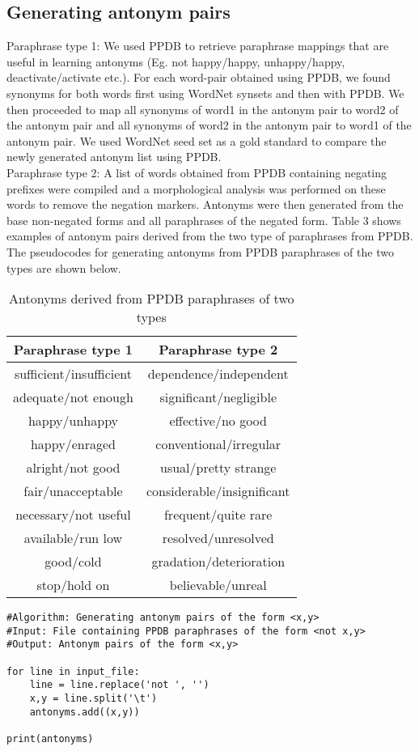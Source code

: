 \documentclass[11pt]{article}
\begin{document}
\subsection{Generating antonym pairs}
Paraphrase type 1:  We used PPDB to retrieve paraphrase mappings that are useful in learning antonyms (Eg. not happy/happy, unhappy/happy, deactivate/activate etc.). For each word-pair obtained using PPDB, we found synonyms for both words first using WordNet synsets and then with PPDB. We then proceeded to map all synonyms of word1 in the antonym pair to word2 of the antonym pair and all synonyms of word2 in the antonym pair to word1 of the antonym pair. We used WordNet seed set as a gold standard to compare the newly generated antonym list using PPDB.\\
Paraphrase type 2: A list of words obtained from PPDB containing negating prefixes were compiled and a morphological analysis was performed on these words to remove the negation markers. Antonyms were then generated from the base non-negated forms and all paraphrases of the negated form.
Table 3 shows examples of antonym pairs derived from the two type of paraphrases from PPDB. The pseudocodes for generating antonyms from PPDB paraphrases of the two types are shown below.
\begin{table}
\begin{tabular}[t]{|c|c|}
\hline
Paraphrase type 1 & Paraphrase type 2\\
\hline
sufficient/insufficient & dependence/independent\\
adequate/not enough & significant/negligible\\
happy/unhappy & effective/no good\\
happy/enraged & conventional/irregular\\
alright/not good & usual/pretty strange\\
fair/unacceptable & considerable/insignificant\\
necessary/not useful & frequent/quite rare\\
available/run low & resolved/unresolved\\
good/cold & gradation/deterioration\\
stop/hold on & believable/unreal\\
 \hline
\end{tabular}
\caption {Antonyms derived from PPDB paraphrases of two types}
\end{table}

\begin{lstlisting}
#Algorithm: Generating antonym pairs of the form <x,y>
#Input: File containing PPDB paraphrases of the form <not x,y>
#Output: Antonym pairs of the form <x,y>

for line in input_file:
    line = line.replace('not ', '')
    x,y = line.split('\t')
    antonyms.add((x,y))
    
print(antonyms)
\end{lstlisting}
\end{document}
